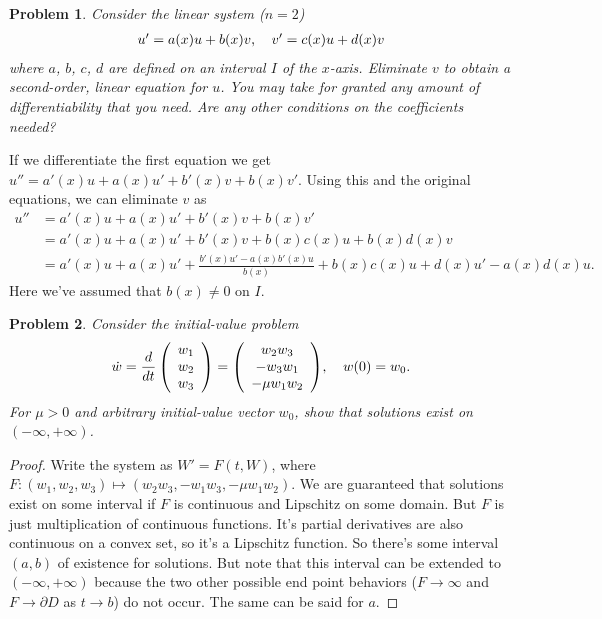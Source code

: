 \documentclass{article}
\newtheorem{problem}{Problem}
\begin{document}
\begin{problem}
Consider the linear system ($n = 2$)
\[
\begin{tabular}{cc}
$u' = a(x) u + b(x) v$, & $v' = c(x) u + d(x) v$
\end{tabular}
\]
where $a$, $b$, $c$, $d$ are defined on an interval $I$ of the $x$-axis. Eliminate $v$ to obtain a second-order, linear equation for $u$. You may take for granted any amount of differentiability that you need. Are any other conditions on the coefficients needed?
\end{problem}

If we differentiate the first equation we get $u'' = a'(x) u + a(x) u' + b'(x) v + b(x) v'$. Using this and the original equations, we can eliminate $v$ as
\begin{align*}
u''
&= a'(x) u + a(x) u' + b'(x) v + b(x) v'\\
&= a'(x) u + a(x) u' + b'(x) v + b(x)c(x) u + b(x)d(x) v\\
&= a'(x) u + a(x) u' + \frac{b'(x) u' - a(x) b'(x) u}{b(x)} + b(x)c(x) u + d(x)u' - a(x)d(x) u.
\end{align*}
Here we've assumed that $b(x) \neq 0$ on $I$.

\begin{problem}
Consider the initial-value problem
\[
\begin{tabular}{cc}
$\displaystyle{\dot{w} = \frac{d}{dt} \left ( \begin{array}{ccc} w_1\\ w_2\\ w_3 \end{array} \right ) = \left ( \begin{array}{ccc} w_2w_3\\ -w_3w_1\\ -\mu w_1w_2 \end{array} \right )}$, & $\displaystyle{w(0) = w_0}$.
\end{tabular}
\]
For $\mu > 0$ and arbitrary initial-value vector $w_0$, show that solutions exist on $(-\infty, +\infty)$.
\end{problem}
\begin{proof}
Write the system as $W' = F(t,W)$, where $F : (w_1, w_2, w_3) \mapsto (w_2w_3, -w_1w_3, -\mu w_1w_2)$. We are guaranteed that solutions exist on some interval if $F$ is continuous and Lipschitz on some domain. But $F$ is just multiplication of continuous functions. It's partial derivatives are also continuous on a convex set, so it's a Lipschitz function. So there's some interval $(a,b)$ of existence for solutions. But note that this interval can be extended to $(-\infty, +\infty)$ because the two other possible end point behaviors ($F \rightarrow \infty$ and $F \rightarrow \partial D$ as $t \rightarrow b$) do not occur. The same can be said for $a$.
\end{proof}
\end{document}
